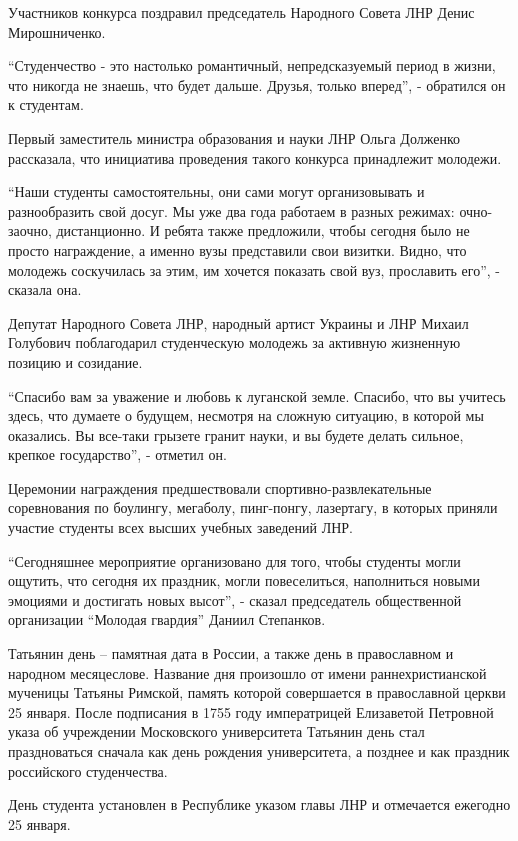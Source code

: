 Участников конкурса поздравил председатель Народного Совета ЛНР Денис
Мирошниченко.

\enquote{Студенчество - это настолько романтичный, непредсказуемый период в жизни, что
никогда не знаешь, что будет дальше. Друзья, только вперед}, - обратился он к
студентам.

Первый заместитель министра образования и науки ЛНР Ольга Долженко рассказала,
что инициатива проведения такого конкурса принадлежит молодежи.

\enquote{Наши студенты самостоятельны, они сами могут организовывать и разнообразить
свой досуг. Мы уже два года работаем в разных режимах: очно-заочно,
дистанционно. И ребята также предложили, чтобы сегодня было не просто
награждение, а именно вузы представили свои визитки. Видно, что молодежь
соскучилась за этим, им хочется показать свой вуз, прославить его}, - сказала
она.

Депутат Народного Совета ЛНР, народный артист Украины и ЛНР Михаил Голубович
поблагодарил студенческую молодежь за активную жизненную позицию и созидание.

\enquote{Спасибо вам за уважение и любовь к луганской земле. Спасибо, что вы учитесь
здесь, что думаете о будущем, несмотря на сложную ситуацию, в которой мы
оказались. Вы все-таки грызете гранит науки, и вы будете делать сильное,
крепкое государство}, - отметил он.

Церемонии награждения предшествовали спортивно-развлекательные соревнования по
боулингу, мегаболу, пинг-понгу, лазертагу, в которых приняли участие студенты
всех высших учебных заведений ЛНР.  

\enquote{Сегодняшнее мероприятие организовано для того, чтобы студенты могли ощутить,
что сегодня их праздник, могли повеселиться, наполниться новыми эмоциями и
достигать новых высот}, - сказал председатель общественной организации \enquote{Молодая
гвардия} Даниил Степанков.

Татьянин день – памятная дата в России, а также день в православном и народном
месяцеслове. Название дня произошло от имени раннехристианской мученицы Татьяны
Римской, память которой совершается в православной церкви 25 января. После
подписания в 1755 году императрицей Елизаветой Петровной указа об учреждении
Московского университета Татьянин день стал праздноваться сначала как день
рождения университета, а позднее и как праздник российского студенчества.

День студента установлен в Республике указом главы ЛНР и отмечается ежегодно 25
января.
